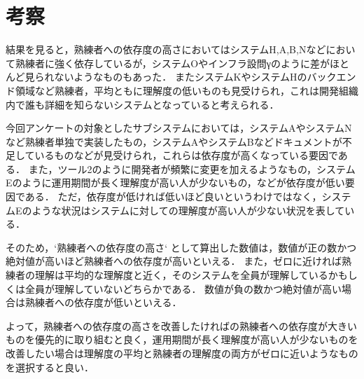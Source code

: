 \section{考察}

結果を見ると，熟練者への依存度の高さにおいてはシステムH,A,B,Nなどにおいて熟練者に強く依存しているが，システムOやインフラ設問γのように差がほとんど見られないようなものもあった．
またシステムKやシステムHのバックエンド領域など熟練者，平均ともに理解度の低いものも見受けられ，これは開発組織内で誰も詳細を知らないシステムとなっていると考えられる．

今回アンケートの対象としたサブシステムにおいては，システムAやシステムNなど熟練者単独で実装したもの，システムAやシステムBなどドキュメントが不足しているものなどが見受けられ，これらは依存度が高くなっている要因である．
また，ツール2のように開発者が頻繁に変更を加えるようなもの，システムEのように運用期間が長く理解度が高い人が少ないもの，などが依存度が低い要因である．
ただ，依存度が低ければ低いほど良いというわけではなく，システムEのような状況はシステムに対しての理解度が高い人が少ない状況を表している．

そのため，`熟練者への依存度の高さ` として算出した数値は，数値が正の数かつ絶対値が高いほど熟練者への依存度が高いといえる．
また，ゼロに近ければ熟練者の理解は平均的な理解度と近く，そのシステムを全員が理解しているかもしくは全員が理解していないどちらかである．
数値が負の数かつ絶対値が高い場合は熟練者への依存度が低いといえる．

よって，熟練者への依存度の高さを改善したければの熟練者への依存度が大きいものを優先的に取り組むと良く，運用期間が長く理解度が高い人が少ないものを改善したい場合は理解度の平均と熟練者の理解度の両方がゼロに近いようなものを選択すると良い．
